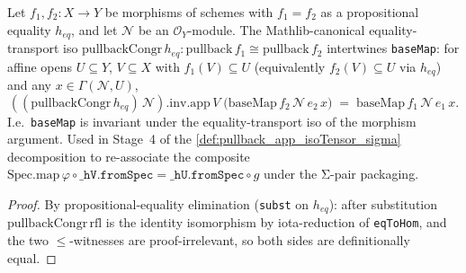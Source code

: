 \begin{lemma}
  \label{lem:baseMap_pullbackCongr_apply}
  \leanok
  Let \(f_1, f_2 : X \to Y\) be morphisms of schemes with
  \(f_1 = f_2\) as a propositional equality \(h_{eq}\), and let
  \(\mathcal N\) be an \(\mathcal O_Y\)-module. The Mathlib-canonical
  equality-transport iso
  \(\text{pullbackCongr}\,h_{eq} : \text{pullback}\,f_1
    \cong \text{pullback}\,f_2\)
  intertwines \texttt{baseMap}: for affine opens \(U \subseteq Y\),
  \(V \subseteq X\) with \(f_1(V) \subseteq U\) (equivalently
  \(f_2(V) \subseteq U\) via \(h_{eq}\)) and any
  \(x \in \Gamma(\mathcal N, U)\),
  \[
    ((\text{pullbackCongr}\,h_{eq})\,\mathcal N).\mathrm{inv}.\mathrm{app}\,V\;
    \bigl(\text{baseMap}\,f_2\,\mathcal N\,e_2\,x\bigr)
    \;=\;
    \text{baseMap}\,f_1\,\mathcal N\,e_1\,x.
  \]
  I.e.\ \texttt{baseMap} is invariant under the equality-transport iso
  of the morphism argument. Used in Stage~4 of the
  \cref{def:pullback_app_isoTensor_sigma} decomposition to re-associate
  the composite
  \(\text{Spec.map}\,\varphi \circ \mathtt{\_hV.fromSpec}
    = \mathtt{\_hU.fromSpec} \circ g\) under the Σ-pair packaging.
\end{lemma}
\begin{proof}
  \leanok
  By propositional-equality elimination (\texttt{subst} on
  \(h_{eq}\)): after substitution \(\text{pullbackCongr}\,\mathrm{rfl}\)
  is the identity isomorphism by iota-reduction of \texttt{eqToHom},
  and the two \(\le\)-witnesses are proof-irrelevant, so both sides
  are definitionally equal.
\end{proof}

